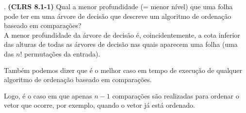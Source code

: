 
. \textbf{(CLRS 8.1-1)} Qual a menor profundidade (= menor nível) que uma folha pode ter em uma árvore de decisão que descreve um algoritmo de ordenação baseado em comparações?\\[6pt]
A menor profundidade da árvore de decisão é, coincidentemente, a cota inferior das alturas de todas as árvores de decisão nas quais aparecem uma folha (uma das $n!$ permutações da entrada).

Também podemos dizer que é o melhor caso em tempo de execução de qualquer algoritmo de ordenação baseado em comparações.

Logo, é o caso em que apenas $n - 1$ comparações são realizadas para ordenar o vetor que ocorre, por exemplo, quando o vetor já está ordenado.\\